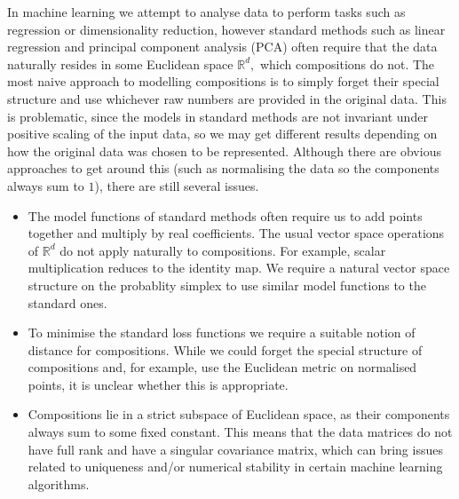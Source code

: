 \documentclass[BSc]{usydthesis}
\numberwithin{equation}{chapter}
\theoremstyle{remark}
\begin{document}
In machine learning we attempt to analyse data to perform tasks such as regression or dimensionality reduction, however standard methods such as linear regression and principal component analysis (PCA) often require that the data naturally resides in some Euclidean space $\mathbb{R}^d,$ which compositions do not. The most naive approach to modelling compositions is to simply forget their special structure and use whichever raw numbers are provided in the original data. This is problematic, since the models in standard methods are not invariant under positive scaling of the input data, so we may get different results depending on how the original data was chosen to be represented. Although there are obvious approaches to get around this (such as normalising the data so the components always sum to $1$), there are still several issues.\\

 \begin{itemize}
  \item The model functions of standard methods often require us to add points together and multiply by real coefficients. The usual vector space operations of $\mathbb{R}^d$ do not apply naturally to compositions. For example, scalar multiplication reduces to the identity map. We require a natural vector space structure on the probablity simplex to use similar model functions to the standard ones.\\
 \item To minimise the standard loss functions we require a suitable notion of distance for compositions. While we could forget the special structure of compositions and, for example, use the Euclidean metric on normalised points, it is unclear whether this is appropriate.\\
  \item Compositions lie in a strict subspace of Euclidean space, as their components always sum to some fixed constant. This means that the data matrices do not have full rank and have a singular covariance matrix, which can bring issues related to uniqueness and/or numerical stability in certain machine learning algorithms.\\ 
 \end{itemize}
 
\end{document}
